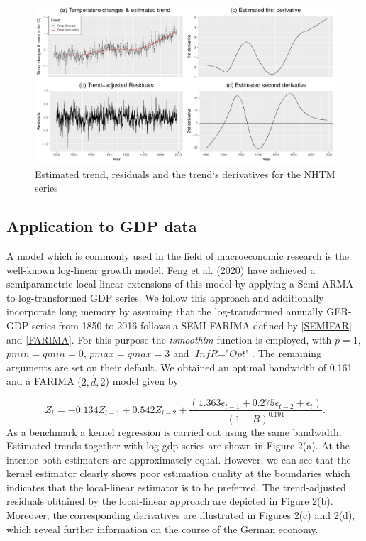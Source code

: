 \documentclass[12pt]{article}
\begin{document}
\begin{figure}[h]
		\includegraphics[trim = {0cm 0mm 0mm 0mm}, width = \textwidth]{Abb/NHtemp.pdf}
		\caption{Estimated trend, residuals and the trend`s derivatives for the NHTM series}
\end{figure}



\subsection{Application to GDP data}
A model which is commonly used in the field of macroeconomic research is the well-known log-linear growth model. Feng et al. (2020) have achieved a semiparametric local-linear extensions of this model by applying a Semi-ARMA to log-transformed GDP series. We follow this approach and additionally incorporate long memory by assuming that the log-transformed annually GER-GDP series from 1850 to 2016 follows a SEMI-FARIMA defined by \eqref{SEMIFAR} and \eqref{FARIMA}. For this purpose the \textit{tsmoothlm} function is employed, with $\textit{p} = 1$, $\textit{pmin} = \textit{qmin} = 0$, $\textit{pmax} = \textit{qmax} = 3$ and $\textit{InfR} = \textit{"Opt"}$. The remaining arguments are set on their default. We obtained an optimal bandwidth of 0.161 and a FARIMA ($2,\hat{d},2$) model given by

\begin{equation}
	Z_t = -0.134 Z_{t-1} + 0.542 Z_{t-2} + \frac{(1.363 \epsilon_{t-1} + 0.275 \epsilon_{t-2} + \epsilon_t)}{(1-B)^{0.191}}.
\end{equation}
As a benchmark a kernel regression is carried out using the same bandwidth. Estimated trends together with log-gdp series are shown in Figure 2(a). At the interior both estimators are approximately equal. However, we can see that the kernel estimator clearly shows poor estimation quality at the boundaries which indicates that the local-linear estimator is to be preferred. The trend-adjusted residuals obtained by the local-linear approach are depicted in Figure 2(b). Moreover, the corresponding derivatives are illustrated in Figures 2(c) and 2(d), which reveal further information on the course of the German economy.
 
\end{document}
